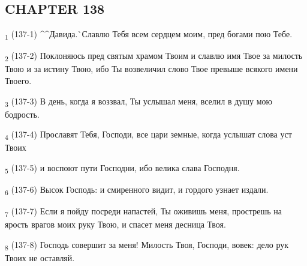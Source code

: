 \subsection{CHAPTER 138}
\begin{tcolorbox}
\textsubscript{1} (137-1) ^^Давида.^^ Славлю Тебя всем сердцем моим, пред богами пою Тебе.
\end{tcolorbox}
\begin{tcolorbox}
\textsubscript{2} (137-2) Поклоняюсь пред святым храмом Твоим и славлю имя Твое за милость Твою и за истину Твою, ибо Ты возвеличил слово Твое превыше всякого имени Твоего.
\end{tcolorbox}
\begin{tcolorbox}
\textsubscript{3} (137-3) В день, когда я воззвал, Ты услышал меня, вселил в душу мою бодрость.
\end{tcolorbox}
\begin{tcolorbox}
\textsubscript{4} (137-4) Прославят Тебя, Господи, все цари земные, когда услышат слова уст Твоих
\end{tcolorbox}
\begin{tcolorbox}
\textsubscript{5} (137-5) и воспоют пути Господни, ибо велика слава Господня.
\end{tcolorbox}
\begin{tcolorbox}
\textsubscript{6} (137-6) Высок Господь: и смиренного видит, и гордого узнает издали.
\end{tcolorbox}
\begin{tcolorbox}
\textsubscript{7} (137-7) Если я пойду посреди напастей, Ты оживишь меня, прострешь на ярость врагов моих руку Твою, и спасет меня десница Твоя.
\end{tcolorbox}
\begin{tcolorbox}
\textsubscript{8} (137-8) Господь совершит за меня! Милость Твоя, Господи, вовек: дело рук Твоих не оставляй.
\end{tcolorbox}
